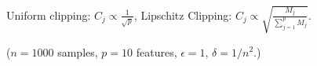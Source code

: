 \documentclass{beamer}
\begin{document}
\begin{frame}

  Uniform clipping: $C_j \propto \frac{1}{\sqrt{p}}$, \hfill
  Lipschitz Clipping: $C_j \propto \sqrt{\frac{M_j}{\sum_{j=1}^p M_j}}$.

  \vspace{1em}

  {\small ($n=1000$ samples, $p=10$ features, $\epsilon = 1$, $\delta = 1/n^2$.)}

\end{frame}


\end{document}
